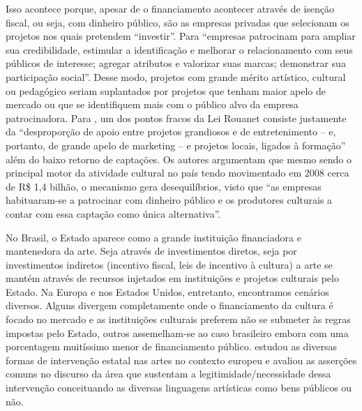 \documentclass[a4paper, 12pt, openright, oneside, german, french, english, brazil]{abntex2}
\begin{document}
	Isso acontece porque, apesar de o financiamento acontecer através de isenção fiscal, ou seja, com dinheiro público, são as empresas privadas que selecionam os projetos nos quais pretendem ``investir''. Para  ``empresas patrocinam para ampliar sua credibilidade, estimular a identificação e melhorar o relacionamento com seus públicos de interesse; agregar atributos e valorizar suas marcas; demonstrar sua participação social''. Desse modo, projetos com grande mérito artístico, cultural ou pedagógico seriam suplantados por projetos que tenham maior apelo de mercado ou que se identifiquem mais com o público alvo da empresa patrocinadora. Para , um dos pontos fracos da Lei Rouanet consiste justamente da ``desproporção de apoio entre projetos grandiosos e de entretenimento -- e, portanto, de grande apelo de marketing -- e projetos locais, ligados à formação'' além do baixo retorno de captações. Os autores argumentam que mesmo sendo o principal motor da atividade cultural no país tendo movimentado em 2008 cerca de R\$ 1,4 bilhão, o mecanismo gera desequilíbrios, visto que ``as empresas habituaram-se a patrocinar com dinheiro público e os produtores culturais a contar com essa captação como única alternativa''\cite[pos. 475]{weiss2009estatais}.
	
	
	
	
	
	No Brasil, o Estado aparece como a grande instituição financiadora e mantenedora da arte. Seja através de investimentos diretos, seja por investimentos indiretos (incentivo fiscal, leis de incentivo à cultura) a arte se mantém através de recursos injetados em instituições e projetos culturais pelo Estado. Na Europa e nos Estados Unidos, entretanto, encontramos cenários diversos. Alguns divergem completamente onde o financiamento da cultura é focado no mercado e as instituições culturais preferem não se submeter às regras impostas pelo Estado, outros assemelham-se ao caso brasileiro embora com uma porcentagem muitíssimo menor de financiamento público.  estudou as diversas formas de intervenção estatal nas artes no contexto europeu e avaliou as asserções comuns no discurso da área que sustentam a legitimidade/necessidade dessa intervenção conceituando as diversas linguagens artísticas como bens públicos ou não. 
	
	
\end{document}
